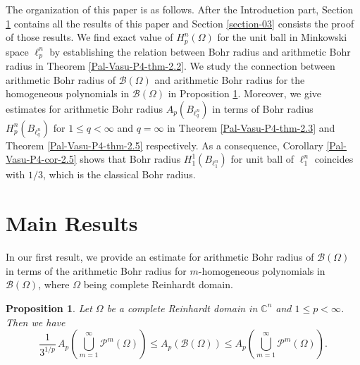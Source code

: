 \documentclass[a4paper,12pt]{amsart}
\newtheorem{prop}[equation]{Proposition}
\theoremstyle{definition}
\begin{document}
The organization of this paper is as follows. After the Introduction part, Section \ref{section-2} contains all the results of this paper and Section \ref{section-03} consists the proof of those results. We find exact value of $H^n_p(\Omega)$ for the unit ball in Minkowski space $\ell^n_p$ by establishing the relation between Bohr radius and arithmetic Bohr radius in Theorem \ref{Pal-Vasu-P4-thm-2.2}. We study the connection between arithmetic Bohr radius of $\mathcal{B}(\Omega)$ and arithmetic Bohr radius for the homogeneous polynomials in $\mathcal{B}(\Omega)$ in Proposition \ref{Pal-Vasu-P4-prop-2.1}. Moreover, we give estimates for arithmetic Bohr radius $A_p(B_{\ell^n_q})$ in terms of Bohr radius $H^n_p(B_{\ell^n_q})$ for $1\leq q<\infty$ and $q=\infty$ in Theorem \ref{Pal-Vasu-P4-thm-2.3} and Theorem \ref{Pal-Vasu-P4-thm-2.5} respectively. As a consequence, Corollary \ref{Pal-Vasu-P4-cor-2.5} shows that Bohr radius $H^1_1(B_{\ell^n_1})$ for unit ball of $\ell^n_1$ coincides with $1/3$, which is the classical Bohr radius.
\vspace{1mm}

\section{Main Results}\label{section-2}
In our first result, we provide an estimate for arithmetic Bohr radius of $\mathcal{B}(\Omega)$ in terms of the arithmetic Bohr radius for $m$-homogeneous polynomials in $\mathcal{B}(\Omega)$, where $\Omega$ being complete Reinhardt domain. 
\begin{prop}\label{Pal-Vasu-P4-prop-2.1}
	Let $\Omega$ be a complete Reinhardt domain in $\mathbb{C}^n$ and $1\leq p <\infty$. Then we have 
	\begin{equation}\label{Pal-Vasu-e-2.2}
		 \frac{1}{3^{1/p}}\, A_p\left(\bigcup_{m=1}^{\infty}\mathcal{P}^{m}(\Omega)\right) \leq A_p\left(\mathcal{B}(\Omega)\right) \leq A_p\left(\bigcup_{m=1}^{\infty}\mathcal{P}^m(\Omega)\right).
	\end{equation}  
\end{prop}
\end{document}
